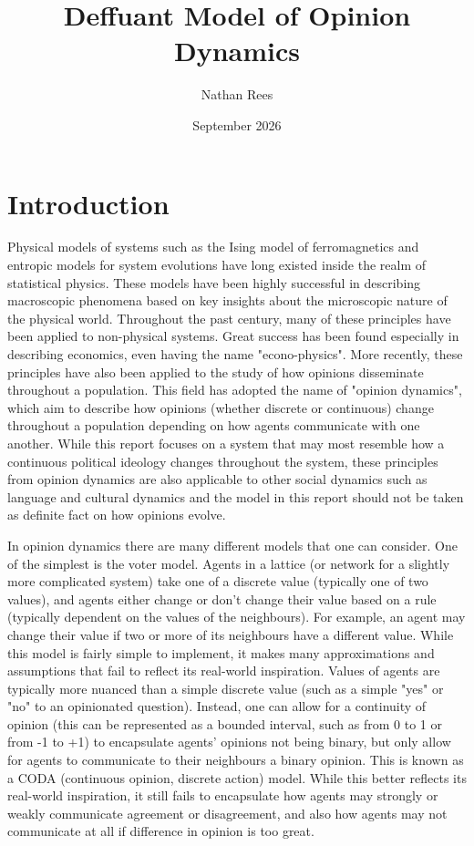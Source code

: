 \documentclass{article}
\title{Deffuant Model of Opinion Dynamics}
\author{Nathan Rees}
\date{September 2026}
\begin{document}
\maketitle

\section{Introduction}
Physical models of systems such as the Ising model of ferromagnetics and entropic models for system evolutions have long existed inside the realm of statistical physics. These models have been highly successful in describing macroscopic phenomena based on key insights about the microscopic nature of the physical world. Throughout the past century, many of these principles have been applied to non-physical systems. Great success has been found especially in describing economics, even having the name "econo-physics". More recently, these principles have also been applied to the study of how opinions disseminate throughout a population. This field has adopted the name of "opinion dynamics", which aim to describe how opinions (whether discrete or continuous) change throughout a population depending on how agents communicate with one another. While this report focuses on a system that may most resemble how a continuous political ideology changes throughout the system, these principles from opinion dynamics are also applicable to other social dynamics such as language and cultural dynamics and the model in this report should not be taken as definite fact on how opinions evolve.

In opinion dynamics there are many different models that one can consider. One of the simplest is the voter model. Agents in a lattice (or network for a slightly more complicated system) take one of a discrete value (typically one of two values), and agents either change or don't change their value based on a rule (typically dependent on the values of the neighbours). For example, an agent may change their value if two or more of its neighbours have a different value. While this model is fairly simple to implement, it makes many approximations and assumptions that fail to reflect its real-world inspiration. Values of agents are typically more nuanced than a simple discrete value (such as a simple "yes" or "no" to an opinionated question). Instead, one can allow for a continuity of opinion (this can be represented as a bounded interval, such as from 0 to 1 or from -1 to +1) to encapsulate agents' opinions not being binary, but only allow for agents to communicate to their neighbours a binary opinion. This is known as a CODA (continuous opinion, discrete action) model. While this better reflects its real-world inspiration, it still fails to encapsulate how agents may strongly or weakly communicate agreement or disagreement, and also how agents may not communicate at all if difference in opinion is too great.
\end{document}
